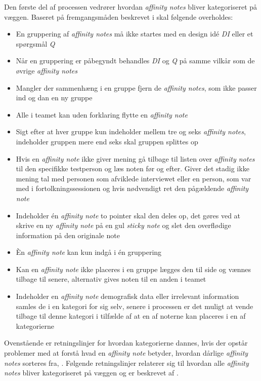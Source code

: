 Den første del af processen vedrører hvordan \textit{affinity notes} bliver kategoriseret på væggen. Baseret på fremgangsmåden beskrevet i \textcite[ss. 166-168]{Book:BuildingAnAffinity} skal følgende overholdes: \blankline
%
\begin{itemize}
  \item En gruppering af \textit{affinity notes} må ikke startes med en design idé \textit{DI} eller et spørgsmål \textit{Q}
  \item Når en gruppering er påbegyndt behandles \textit{DI} og \textit{Q} på samme vilkår som de øvrige \textit{affinity notes}
  \item Mangler der sammenhæng i en gruppe fjern de \textit{affinity notes}, som ikke passer ind og dan en ny gruppe
  \item Alle i teamet kan uden forklaring flytte en \textit{affinity note}
  \item Sigt efter at hver gruppe kun indeholder mellem tre og seks \textit{affinity notes}, indeholder gruppen mere end seks skal gruppen splittes op
  \item Hvis en \textit{affinity note} ikke giver mening gå tilbage til listen over \textit{affinity notes} til den specifikke testperson og læs noten før og efter. Giver det stadig ikke mening tal med personen som afviklede interviewet eller en person, som var med i fortolkningssessionen og hvis nødvendigt ret den pågældende \textit{affinity note}
  \item Indeholder én \textit{affinity note} to pointer skal den deles op, det gøres ved at skrive en ny \textit{affinity note} på en gul \textit{sticky note} og slet den overflødige information på den originale note
  \item Èn \textit{affinity note} kan kun indgå i én gruppering
  \item Kan en \textit{affinity note} ikke placeres i en gruppe lægges den til side og vænnes tilbage til senere, alternativ gives noten til en anden i teamet
  \item Indeholder en \textit{affinity note} demografisk data eller irrelevant information samles de i en kategori for sig selv, senere i processen er det muligt at vende tilbage til denne kategori i tilfælde af at en af noterne kan placeres i en af kategorierne \blankline
\end{itemize}
%
Ovenstående er retningslinjer for hvordan kategorierne dannes, hvis der opstår problemer med at forstå hvad en \textit{affinity note} betyder, hvordan dårlige \textit{affinity notes} sorteres fra, \parencite[ss. 166-168]{Book:BuildingAnAffinity}. Følgende retningslinjer relaterer sig til hvordan alle \textit{affinity notes} bliver kategoriseret på væggen og er beskrevet af \textcite[s. 168]{Book:BuildingAnAffinity}.\blankline
